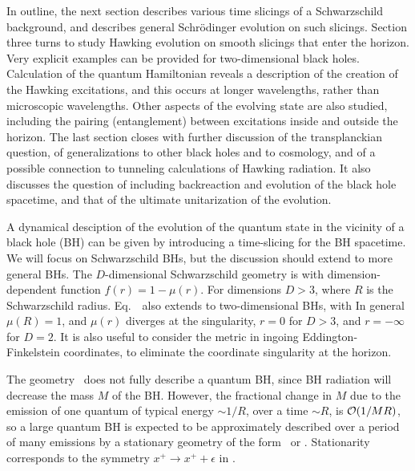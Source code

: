 In outline, the next section describes various time slicings of a Schwarzschild background, and describes general Schr\"odinger evolution on such slicings.  Section 
three turns to study Hawking evolution on smooth slicings that enter the horizon.  Very explicit examples can be provided for two-dimensional black holes.  Calculation of the quantum Hamiltonian reveals a description of the creation of the Hawking excitations, and this occurs at longer wavelengths, rather than microscopic wavelengths.  Other aspects of the evolving state are also studied, including the pairing (entanglement) between excitations inside and outside the horizon.  The last section closes with further discussion of the transplanckian question, of generalizations to other black holes and to cosmology, and of a possible connection to tunneling calculations of Hawking radiation.  It also discusses the question of including backreaction and evolution of the black hole spacetime, and that of the ultimate unitarization of the evolution.




A dynamical desciption of the evolution of the quantum state in the vicinity of a black hole (BH) can be given by introducing a time-slicing for the BH spacetime.  We will focus on  Schwarzschild BHs, but the discussion should extend to more general BHs.  The $D$-dimensional Schwarzschild geometry is
%
\eqn{}
%
with dimension-dependent function $f(r)=1-\mu(r)$.
For dimensions $D>3$,
%
\eqn{}
%
where $R$ is the Schwarzschild radius.  Eq.~\Schw\ also extends to
two-dimensional BHs, with
%
\eqn{}
%
In general $\mu(R)=1$, and $\mu(r)$ diverges at the singularity, $r=0$ for $D>3$, and $r=-\infty$ for $D=2$.
It is also useful to consider the metric in ingoing Eddington-Finkelstein coordinates,
%
\eqn{}
%
to eliminate the coordinate singularity at the horizon.

The geometry \Schw\ does not fully describe a quantum BH, since BH radiation will decrease the mass $M$ of the BH.  However, the fractional change in  $M$ due to the emission of one quantum of typical energy $\sim 1/R$, over a time $\sim R$, is ${\cal O}(1/MR)$, so a large quantum BH is expected to be approximately described over a period of many emissions by a stationary geometry of the form \Schw\ or \EF.  Stationarity corresponds to the symmetry $x^+\rightarrow x^+ + \epsilon$ in \EF.

